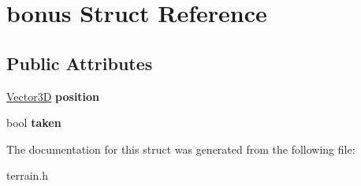 \hypertarget{structbonus}{\section{bonus \-Struct \-Reference}
\label{structbonus}
}
\subsection*{\-Public \-Attributes}
\begin{DoxyCompactItemize}
\item 
\hypertarget{structbonus_a581d1ff363d3eb8de4185b832c9b02ed}{\hyperlink{classVector3D}{\-Vector3\-D} {\bfseries position}}\label{structbonus_a581d1ff363d3eb8de4185b832c9b02ed}

\item 
\hypertarget{structbonus_a070f8351be301cf43e63cfefd2cf23a5}{bool {\bfseries taken}}\label{structbonus_a070f8351be301cf43e63cfefd2cf23a5}

\end{DoxyCompactItemize}


\-The documentation for this struct was generated from the following file\-:\begin{DoxyCompactItemize}
\item 
terrain.\-h\end{DoxyCompactItemize}
